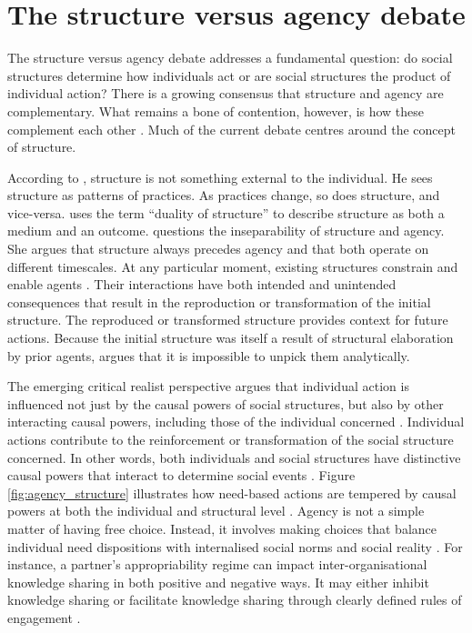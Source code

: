 \section{The structure versus agency debate}

The structure versus agency debate addresses a fundamental question: do social structures determine how individuals act or are social structures the product of individual action? There is a growing consensus that structure and agency are complementary. What remains a bone of contention, however, is how these complement each other \citep{tan2011understanding}. Much of the current debate centres around the concept of structure. \medskip

According to \citet{giddens1984constitution}, structure is not something external to the individual. He sees structure as patterns of practices. As practices change, so does structure, and vice-versa. \citet{giddens1984constitution} uses the term \enquote{duality of structure} to describe structure as both a medium and an outcome. \citet{archer1995realist} questions the inseparability of structure and agency. She argues that structure always precedes agency and that both operate on different timescales. At any particular moment, existing structures constrain and enable agents \citep{emirbayer1998agency}. Their interactions have both intended and unintended consequences that result in the reproduction or transformation of the initial structure. The reproduced or transformed structure provides context for future actions. Because the initial structure was itself a result of structural elaboration by prior agents, \citet{archer1998critical} argues that it is impossible to unpick them analytically. \medskip

The emerging critical realist perspective argues that individual action is influenced not just by the causal powers of social structures, but also by other interacting causal powers, including those of the individual concerned \citep{elder2008searching,elder2010causal,sorrell2018explaining}. Individual actions contribute to the reinforcement or transformation of the social structure concerned. In other words, both individuals and social structures have distinctive causal powers that interact to determine social events \citep{loyal2001agency}. Figure \ref{fig:agency_structure} illustrates how need-based actions are tempered by causal powers at both the individual and structural level \citep{loyal2001agency}. Agency is not a simple matter of having free choice. Instead, it involves making choices that balance individual need dispositions with internalised social norms and social reality \citep{loyal2001agency}. For instance, a partner's appropriability regime can impact inter-organisational knowledge sharing in both positive and negative ways. It may either inhibit knowledge sharing or facilitate knowledge sharing through clearly defined rules of engagement \citep{dahlander2010open,laursen2014paradox,llanes2018competitive}. \medskip

